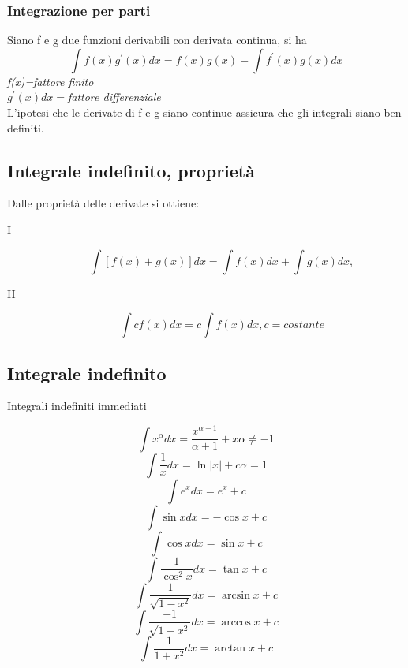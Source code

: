 \subsubsection{Integrazione per parti}
Siano f e g due funzioni derivabili con derivata continua, si ha
\begin{equation*}
	\int f(x)g^\prime(x)dx=f(x)g(x)-\int f^\prime (x)g(x)dx
\end{equation*}
\textit{f(x)=fattore finito}\\
$g^\prime(x)dx=$\textit{fattore differenziale}\\
L'ipotesi che le derivate di f e g siano continue assicura che gli integrali siano ben definiti.
\subsection{Integrale indefinito, proprietà}
Dalle proprietà delle derivate si ottiene:
\begin{description}
	\item[I] \begin{equation*}
			\int[f(x)+g(x)]dx=\int f(x)dx+\int g(x)dx,
		\end{equation*}
	\item[II] \begin{equation*}
			\int cf(x)dx=c\int f(x)dx, c=costante
	\end{equation*}
\end{description}
\subsection{Integrale indefinito}
Integrali indefiniti immediati
\begin{multicols}{2}
	\begin{equation*}
		\int x^\alpha dx=\frac{x^{\alpha+1}}{\alpha+1}+x \alpha\neq -1
	\end{equation*}
	\begin{equation*}
		\int \frac{1}{x}dx=\ln|x|+c  \alpha=1
	\end{equation*}
	\begin{equation*}
		\int e^xdx=e^x+c
	\end{equation*}
	\begin{equation*}
		\int \sin x dx=-\cos x+c
	\end{equation*}
	\begin{equation*}
		\int \cos x dx=\sin x+c
	\end{equation*}
	\begin{equation*}
		\int\frac{1}{\cos^2x}dx=\tan x+c
	\end{equation*}
	\begin{equation*}
		\int \frac{1}{\sqrt{1-x^2}}dx=\arcsin x+c
	\end{equation*}
	\begin{equation*}
		\int \frac{-1}{\sqrt{1-x^2}}dx=\arccos x+c
	\end{equation*}
	\begin{equation*}
		\int \frac{1}{1+x^2}dx=\arctan x + c
	\end{equation*}
\end{multicols}

